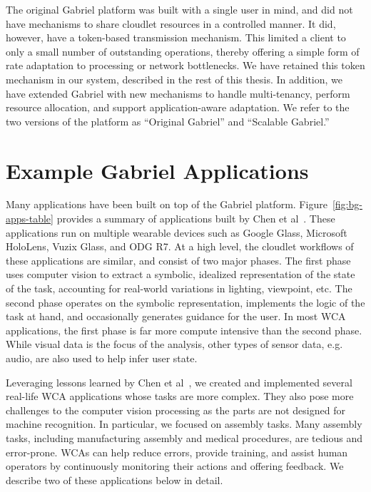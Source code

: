 The original Gabriel platform was built with a single user in mind, and did not
have mechanisms to share cloudlet resources in a controlled manner.  It did,
however, have a token-based transmission mechanism.  This limited a client to
only a small number of outstanding operations, thereby offering a simple form of
rate adaptation to processing or network bottlenecks.  We have retained this
token mechanism in our system, described in the rest of this thesis. In
addition, we have extended Gabriel with new mechanisms to handle multi-tenancy,
perform resource allocation, and support application-aware adaptation.  We refer
to the two versions of the platform as ``Original Gabriel'' and ``Scalable
Gabriel.''

\section{Example Gabriel Applications}



Many applications have been built on top of the Gabriel platform.
Figure~\ref{fig:bg-apps-table} provides a summary of applications built by Chen
et al~\cite{chen2018application}. These applications run on multiple wearable
devices such as Google Glass, Microsoft HoloLens, Vuzix Glass, and ODG R7. At a
high level, the cloudlet workflows of these applications are similar, and
consist of two major phases. The first phase uses computer vision to extract a
symbolic, idealized representation of the state of the task, accounting for
real-world variations in lighting, viewpoint, etc.  The second phase operates on
the symbolic representation, implements the logic of the task at hand, and
occasionally generates guidance for the user.  In most WCA applications, the
first phase is far more compute intensive than the second phase. While visual
data is the focus of the analysis, other types of sensor data, e.g. audio, are
also used to help infer user state.

Leveraging lessons learned by Chen et al~\cite{chen2018application}, we created
and implemented several real-life WCA applications whose tasks are more complex.
They also pose more challenges to the computer vision processing as the parts
are not designed for machine recognition. In particular, we focused on assembly
tasks. Many assembly tasks, including manufacturing assembly and medical
procedures, are tedious and error-prone. WCAs can help reduce errors, provide
training, and assist human operators by continuously monitoring their actions and
offering feedback. We describe two of these applications below in detail.

